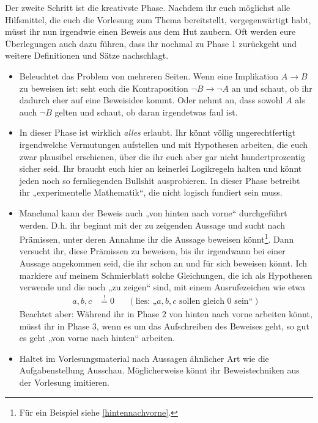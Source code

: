 \begin{phasetwo}[Rumprobieren] \label{rumprobieren}
    Der zweite Schritt ist die kreativste Phase. Nachdem ihr euch möglichst alle Hilfsmittel, die euch die Vorlesung zum Thema bereitstellt, vergegenwärtigt habt, müsst ihr nun irgendwie einen Beweis aus dem Hut zaubern. Oft werden eure Überlegungen auch dazu führen, dass ihr nochmal zu Phase 1 zurückgeht und weitere Definitionen und Sätze nachschlagt.
    \begin{itemize}
        \item Beleuchtet das Problem von mehreren Seiten. Wenn eine Implikation $A\to B$ zu beweisen ist: seht euch die Kontraposition $\neg B\to \neg A$ an und schaut, ob ihr dadurch eher auf eine Beweisidee kommt. Oder nehmt an, dass sowohl $A$ als auch $\neg B$ gelten und schaut, ob daran irgendetwas faul ist.
        \item In dieser Phase ist wirklich \emph{alles} erlaubt. Ihr könnt völlig ungerechtfertigt irgendwelche Vermutungen aufstellen und mit Hypothesen arbeiten, die euch zwar plausibel erschienen, über die ihr euch aber gar nicht hundertprozentig sicher seid. Ihr braucht euch hier an keinerlei Logikregeln halten und könnt jeden noch so fernliegenden Bullshit ausprobieren. In dieser Phase betreibt ihr „experimentelle Mathematik“, die nicht logisch fundiert sein muss.
        \item Manchmal kann der Beweis auch „von hinten nach vorne“ durchgeführt werden. D.h. ihr beginnt mit der zu zeigenden Aussage und sucht nach Prämissen, unter deren Annahme ihr die Aussage beweisen könnt\footnote{Für ein Beispiel siehe \cref{hintennachvorne}.}. Dann versucht ihr, diese Prämissen zu beweisen, bis ihr irgendwann bei einer Aussage angekommen seid, die ihr schon an und für sich beweisen könnt. Ich markiere auf meinem Schmierblatt solche Gleichungen, die ich als Hypothesen verwende und die noch „zu zeigen“ sind, mit einem Ausrufezeichen wie etwa
        \begin{align*}
            a,b,c & \stackrel{!}{=} 0 && (\text{lies: „$a,b,c$ sollen gleich $0$ sein“})
        \end{align*}
        Beachtet aber: Während ihr in Phase 2 von hinten nach vorne arbeiten könnt, müsst ihr in Phase 3, wenn es um das Aufschreiben des Beweises geht, so gut es geht „von vorne nach hinten“ arbeiten.
        \item Haltet im Vorlesungsmaterial nach Aussagen ähnlicher Art wie die Aufgabenstellung Ausschau. Möglicherweise könnt ihr Beweistechniken aus der Vorlesung imitieren.

\end{itemize}
\end{phasetwo}
